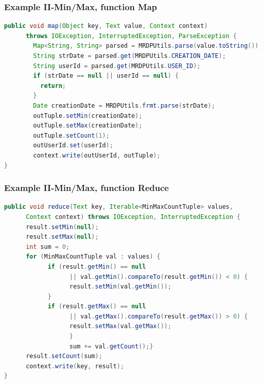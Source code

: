 \documentclass[xcolor=dvipsnames,dvip,notes=show,table]{beamer}
\begin{document}


\begin{frame}[fragile]
  \frametitle{Example II-Min/Max, function Map}

\begin{lstlisting}[language=Java]
public void map(Object key, Text value, Context context)
      throws IOException, InterruptedException, ParseException {
        Map<String, String> parsed = MRDPUtils.parse(value.toString());
        String strDate = parsed.get(MRDPUtils.CREATION_DATE);
        String userId = parsed.get(MRDPUtils.USER_ID);
        if (strDate == null || userId == null) {
          return;
        }
        Date creationDate = MRDPUtils.frmt.parse(strDate);
        outTuple.setMin(creationDate);
        outTuple.setMax(creationDate);
        outTuple.setCount(1);
        outUserId.set(userId);
        context.write(outUserId, outTuple);
}
\end{lstlisting}

\end{frame}

\begin{frame}[fragile]
  \frametitle{Example II-Min/Max, function Reduce}

\begin{lstlisting}[language=Java]
public void reduce(Text key, Iterable<MinMaxCountTuple> values,
      Context context) throws IOException, InterruptedException {
      result.setMin(null);
      result.setMax(null);
      int sum = 0;
      for (MinMaxCountTuple val : values) {
            if (result.getMin() == null
                  || val.getMin().compareTo(result.getMin()) < 0) {
                  result.setMin(val.getMin());
            }
            if (result.getMax() == null
                  || val.getMax().compareTo(result.getMax()) > 0) {
                  result.setMax(val.getMax());
                  }
                  sum += val.getCount();}
      result.setCount(sum);
      context.write(key, result);
}
\end{lstlisting}

\end{frame}
\end{document}
